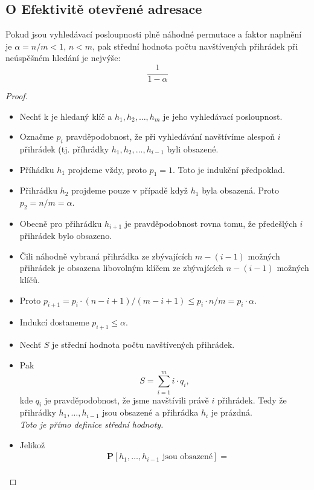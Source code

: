 \subsection{O Efektivitě otevřené adresace}

\begin{theorem}
Pokud jsou vyhledávací posloupnosti plně náhodné permutace a faktor naplnění je $\alpha = n/m < 1$, $n < m$, pak střední hodnota počtu navštívených přihrádek při neúspěšném hledání je nejvýše:
$$\frac{1}{1 - \alpha}$$
\end{theorem}

\begin{proof}
\begin{itemize}
    \item Nechť k je hledaný klíč a $h_1, h_2, \dots, h_m$ je jeho vyhledávací posloupnost.
    \item Označme $p_i$ pravděpodobnost, že při vyhledávání navštívíme alespoň $i$ přihrádek (tj. příhrádky $h_1, h_2, \dots, h_{i-1}$ byli obsazené.
    \item Příhádku $h_1$ projdeme vždy, proto $p_1 = 1$. Toto je indukční předpoklad.
    \item Přihrádku $h_2$ projdeme pouze v případě když $h_1$ byla obsazená. Proto $p_2 = n/m = \alpha$.
    \item Obecně pro přihrádku $h_{i+1}$ je pravděpodobnost rovna tomu, že předešlých $i$ přihrádek bylo obsazeno.
    \item Čili náhodně vybraná přihrádka ze zbývajících $m - (i - 1)$
    možných přihrádek je obsazena libovolným klíčem ze zbývajících
    $n - (i - 1)$ možných klíčů.
    \item Proto $p_{i+1} = p_i \cdot (n - i + 1) / (m - i + 1) \leq p_i \cdot n/m = p_i \cdot \alpha$.
    \item Indukcí dostaneme $p_{i+1} \leq \alpha$.
    \item Nechť $S$ je střední hodnota počtu navštívených přihrádek.
    \item Pak
    \[
        S = \sum_{i=1}^{m} i \cdot q_i,
    \]
    kde $q_i$ je pravděpodobnost, že jsme navštívili právě $i$ přihrádek. Tedy že přihrádky $h_1, \ldots, h_{i-1}$ jsou obsazené a přihrádka $h_i$ je prázdná. \\
    \textit{Toto je přímo definice střední hodnoty.}
    \item Jelikož
    \[
    \begin{aligned}
        &\mathbf{P}[h_1,\ldots,h_{i-1}\text{ jsou obsazené}] = \\

\end{aligned}\]
\end{itemize}
\end{proof}
